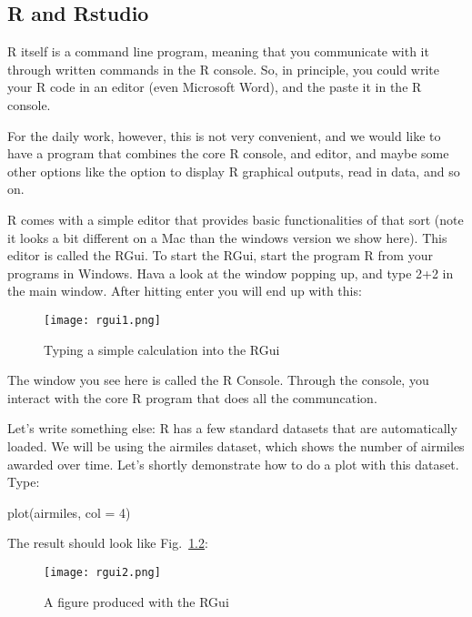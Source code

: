\documentclass[a4paper,twoside]{tufte-book}\usepackage[]{graphicx}\usepackage[]{color}
\begin{document}
{\begin{appendices}
\chapter{R and Rstudio}

R itself is a command line program, meaning that you communicate with it through written commands in the R console. So, in principle, you could write your R code in an editor (even Microsoft Word), and the paste it in the R console. 

For the daily work, however, this is not very convenient, and we would like to have a program that combines the core R console, and editor, and maybe some other options like the option to display R graphical outputs, read in data, and so on. 

R comes with a simple editor that provides basic functionalities of that sort (note it looks a bit different on a Mac than the windows version we show here). This editor is called the RGui. To start the RGui, start the program R from your programs in Windows. Hava a look at the window popping up, and type 2+2 in the main window. After hitting enter you will end up with this:

\begin{figure}[]
\begin{center}
\texttt{[image: rgui1.png]}
\caption{Typing a simple calculation into the RGui}
\label{fig: Rgui1}
\end{center}
\end{figure}


The window you see here is called the R Console. Through the console, you interact with the core R program that does all the communcation. 

Let's write something else: R has a few standard datasets that are automatically loaded. We will be using the airmiles dataset, which shows the number of airmiles awarded over time. Let's shortly demonstrate how to do a plot with this dataset. Type:

\begin{Schunk}
\begin{Sinput}
plot(airmiles, col = 4)
\end{Sinput}
\end{Schunk}

The result should look like Fig.~\ref{fig: Rgui2}:

\begin{figure}[]
\begin{center}
\texttt{[image: rgui2.png]}
\caption{A figure produced with the RGui}
\label{fig: Rgui2}
\end{center}
\end{figure}


\end{appendices}}
\end{document}

